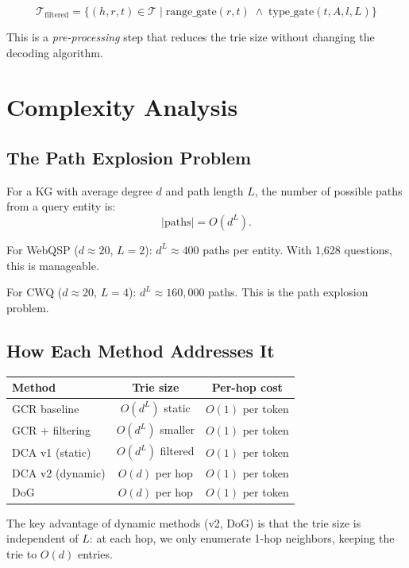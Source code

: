 \documentclass[11pt,a4paper]{article}
\begin{document}
\[
  \mathcal{T}_{\text{filtered}} = \{(h, r, t) \in \mathcal{T} \mid
  \text{range\_gate}(r, t) \;\land\;
  \text{type\_gate}(t, A, l, L)\}
\]

This is a \emph{pre-processing} step that reduces the trie size without
changing the decoding algorithm.

\section{Complexity Analysis}

\subsection{The Path Explosion Problem}

For a KG with average degree $d$ and path length $L$, the number of
possible paths from a query entity is:
\[
  |\text{paths}| = O(d^L).
\]

For WebQSP ($d \approx 20$, $L = 2$): $d^L \approx 400$ paths per
entity.  With 1,628 questions, this is manageable.

For CWQ ($d \approx 20$, $L = 4$): $d^L \approx 160{,}000$ paths.
This is the path explosion problem.

\subsection{How Each Method Addresses It}

\begin{center}
\small
\begin{tabular}{@{}lcc@{}}
\toprule
  Method & Trie size & Per-hop cost \\
\midrule
  GCR baseline   & $O(d^L)$ static   & $O(1)$ per token \\
  GCR + filtering & $O(d^L)$ smaller  & $O(1)$ per token \\
  DCA v1 (static) & $O(d^L)$ filtered & $O(1)$ per token \\
  DCA v2 (dynamic) & $O(d)$ per hop   & $O(1)$ per token \\
  DoG             & $O(d)$ per hop    & $O(1)$ per token \\
\bottomrule
\end{tabular}
\end{center}

The key advantage of dynamic methods (v2, DoG) is that the trie size is
independent of $L$: at each hop, we only enumerate 1-hop neighbors,
keeping the trie to $O(d)$ entries.
\end{document}

